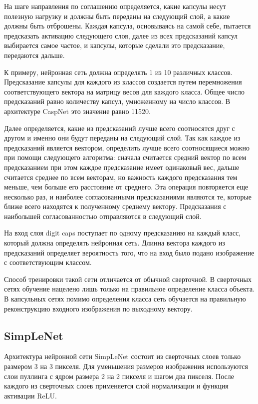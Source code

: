 На шаге направления по соглашению определяется, какие капсулы несут полезную нагрузку и должны быть переданы на следующий слой, а какие должны быть отброшены. Каждая капсула, основываясь на самой себе, пытается предсказать активацию следующего слоя, далее из всех предсказаний капсул выбирается самое частое, и капсулы, которые сделали это предсказание, передаются дальше.

К примеру, нейронная сеть должна определять 1 из 10 различных классов. Предсказание капсулы для каждого из классов создается путем перемножения соответствующего вектора на матрицу весов для каждого класса. Общее число предсказаний равно количеству капсул, умноженному на число классов. В архитектуре CaspNet это значение равно 11520.

Далее определяется, какие из предсказаний лучше всего соотносятся друг с другом и именно они будут переданы на следующий слой. Так как каждое из предсказаний является вектором, определить лучше всего соотносящиеся можно при помощи следующего алгоритма: сначала считается средний вектор по всем предсказанием при этом каждое предсказание имеет одинаковый вес, дальше считается среднее по всем векторам, но важность каждого предсказания тем меньше, чем больше его расстояние от среднего. Эта операция повторяется еще несколько раз, и наиболее согласованными предсказаниями являются те, которые ближе всего находятся к полученному среднему вектору. Предсказания с наибольшей согласованностью отправляются в следующий слой.

На вход слоя digit caps поступает по одному предсказанию на каждый класс, который должна определять нейронная сеть. Длинна вектора каждого из предсказаний определяет вероятность того, что на вход было подано изображение с соответствующим классом.

Способ тренировки такой сети отличается от обычной сверточной. В сверточных сетях обучение нацелено лишь только на правильное определение класса объекта. В капсульных сетях помимо определения класса сеть обучается на правильную реконструкцию входного изображения по выходному вектору.

\subsection{SimpLeNet}
Архитектура нейронной сети SimpLeNet состоит из сверточных слоев только размером 3 на 3 пикселя. Для уменьшения размеров изображения используются слои пуллинга с ядром размера 2 на 2 пикселя и шагом два пикселя. После каждого из сверточных слоев применяется слой нормализации и функция активации ReLU.

